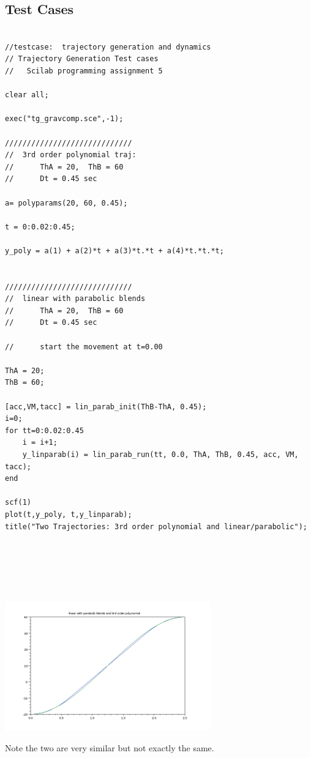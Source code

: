 \documentclass{article}
\begin{document}
\subsection{Test Cases}
\begin{verbatim}

//testcase:  trajectory generation and dynamics
// Trajectory Generation Test cases
//   Scilab programming assignment 5

clear all;

exec("tg_gravcomp.sce",-1);

/////////////////////////////
//  3rd order polynomial traj:
//      ThA = 20,  ThB = 60
//      Dt = 0.45 sec

a= polyparams(20, 60, 0.45);

t = 0:0.02:0.45;

y_poly = a(1) + a(2)*t + a(3)*t.*t + a(4)*t.*t.*t;


/////////////////////////////
//  linear with parabolic blends
//      ThA = 20,  ThB = 60
//      Dt = 0.45 sec

//      start the movement at t=0.00

ThA = 20;
ThB = 60;

[acc,VM,tacc] = lin_parab_init(ThB-ThA, 0.45);
i=0;
for tt=0:0.02:0.45
    i = i+1;
    y_linparab(i) = lin_parab_run(tt, 0.0, ThA, ThB, 0.45, acc, VM, tacc);
end

scf(1)
plot(t,y_poly, t,y_linparab);
title("Two Trajectories: 3rd order polynomial and linear/parabolic");






\end{verbatim}

\includegraphics[width=3.5in]{trajtestscilab.png}

Note the two are very similar but not exactly the same.
\end{document}
